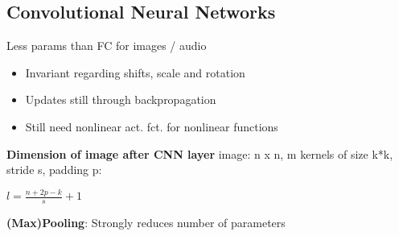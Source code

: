 \subsection{Convolutional Neural Networks}

Less params than FC for images / audio
\begin{itemize}
    \item Invariant regarding shifts, scale and rotation
    \item Updates still through backpropagation
    \item Still need nonlinear act. fct. for nonlinear functions
\end{itemize}

\textbf{Dimension of image after CNN layer}
image: n x n, m kernels of size k*k, stride s, padding p:

\begin{center}
    $l = \frac{n + 2p -k}{s} + 1$
\end{center}

\textbf{(Max)Pooling}: Strongly reduces number of parameters
